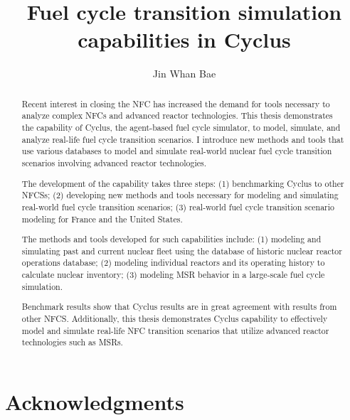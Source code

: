 \documentclass{report}
\begin{document}
\title{Fuel cycle transition simulation capabilities in Cyclus}
\author{Jin Whan Bae}
\maketitle


\begin{abstract}
Recent interest in closing the \gls{NFC} has increased the demand for tools necessary
to analyze complex \glspl{NFC} and advanced reactor technologies.
This thesis demonstrates the capability of Cyclus, the
agent-based fuel cycle simulator, to model, simulate, and analyze
real-life fuel cycle transition scenarios. I introduce new methods
and tools that use various databases to model and simulate real-world
nuclear fuel cycle transition scenarios involving advanced reactor
technologies.

The development of the capability takes
three steps: (1) benchmarking
Cyclus to other \glspl{NFCS};
(2) developing new methods and tools necessary for modeling and simulating
real-world fuel cycle transition scenarios; (3) real-world
fuel cycle transition scenario modeling for France and the United States.

The methods and tools developed for such capabilities include:
(1) modeling and simulating past and current
nuclear fleet using the database of historic nuclear reactor operations
database; (2) modeling individual reactors and its operating history
to calculate nuclear inventory; (3) modeling \gls{MSR} behavior
in a large-scale fuel cycle simulation.

Benchmark results show that Cyclus results are in great agreement
with results from other \gls{NFCS}.
Additionally, this thesis demonstrates Cyclus capability to effectively
model and simulate real-life \gls{NFC} transition scenarios
that utilize advanced reactor technologies such as \glspl{MSR}.

\end{abstract}

\chapter*{Acknowledgments}
\end{document}

